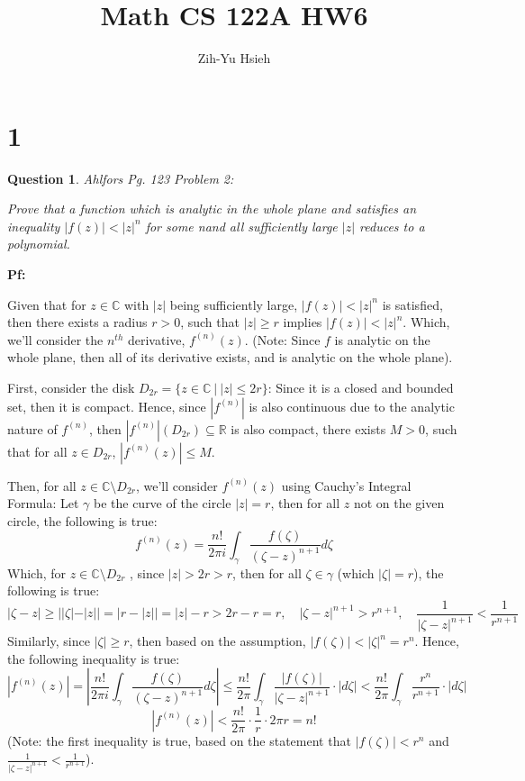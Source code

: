 \documentclass{article}
\title{Math CS 122A HW6}
\author{Zih-Yu Hsieh}
\newtheorem{question}{Question}
\begin{document}
\maketitle

\section*{1}
\begin{myBox}[]{}
    \begin{question}
        Ahlfors Pg. 123 Problem 2:

        Prove that a function which is analytic in the whole plane and
        satisfies an inequality $|f(z)| < |z|^n$ for some nand all sufficiently large $|z|$
        reduces to a polynomial.
    \end{question}
\end{myBox}

\textbf{Pf:}

Given that for $z\in\mathbb{C}$ with $|z|$ being sufficiently large, $|f(z)|< |z|^n$ is satisfied, 
then there exists a radius $r>0$, such that $|z|\geq r$ implies $|f(z)|<|z|^n$. Which, we'll consider the $n^{th}$ derivative,
$f^{(n)}(z)$. (Note: Since $f$ is analytic on the whole plane, then all of its derivative exists, and is analytic on the whole plane).

\hfill

First, consider the disk $D_{2r} = \{z\in\mathbb{C}\ |\ |z|\leq 2r\}$: Since it is a closed and bounded set,
then it is compact. Hence, since $|f^{(n)}|$ is also continuous due to the analytic nature of $f^{(n)}$, 
then $|f^{(n)}|(D_{2r}) \subseteq \mathbb{R}$ is also compact, there exists $M>0$, such that for all $z\in D_{2r}$,
$|f^{(n)}(z)| \leq M$.

\hfill

Then, for all $z\in \mathbb{C}\setminus D_{2r}$, we'll consider $f^{(n)}(z)$ using Cauchy's Integral Formula:
Let $\gamma$ be the curve of the circle $|z|=r$, then for all $z$ not on the given circle, the following is true:
$$f^{(n)}(z) = \frac{n!}{2\pi i}\int_{\gamma}\frac{f(\zeta)}{(\zeta-z)^{n+1}}d\zeta$$
Which, for $z\in \mathbb{C}\setminus D_{2r}$ , since $|z| > 2r > r$, then for all $\zeta \in \gamma$ (which $|\zeta|=r$), the following is true:
$$|\zeta-z| \geq ||\zeta|-|z|| = |r-|z|| = |z|-r > 2r-r = r,\quad |\zeta-z|^{n+1}> r^{n+1},\quad \frac{1}{|\zeta-z|^{n+1}} < \frac{1}{r^{n+1}}$$
Similarly, since $|\zeta|\geq r$, then based on the assumption, $|f(\zeta)| < |\zeta|^n = r^n$.
Hence, the following inequality is true:
$$|f^{(n)}(z)| = \left|\frac{n!}{2\pi i}\int_{\gamma}\frac{f(\zeta)}{(\zeta-z)^{n+1}}d\zeta\right| \leq \frac{n!}{2\pi}\int_{\gamma}\frac{|f(\zeta)|}{|\zeta-z|^{n+1}}\cdot|d\zeta| < \frac{n!}{2\pi}\int_{\gamma}\frac{r^n}{r^{n+1}}\cdot|d\zeta|$$
$$|f^{(n)}(z)| < \frac{n!}{2\pi}\cdot\frac{1}{r}\cdot 2\pi r = n!$$
(Note: the first inequality is true, based on the statement that $|f(\zeta)|< r^n$ and $\frac{1}{|\zeta-z|^{n+1}}<\frac{1}{r^{n+1}}$).
\end{document}
